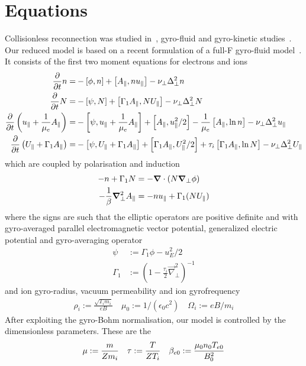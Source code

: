 \section{Equations}
Collisionless reconnection was studied in~\cite{Stanier2015}, gyro-fluid and gyro-kinetic studies~\cite{Comisso2013,Zacharias2014}.
Our reduced model is based on a recent formulation of a full-F gyro-fluid model~\cite{Madsen2013}.
It consists of the first two moment equations for electrons and ions
\begin{align}
\frac{\partial}{\partial t} \ne =&
 - \left[\phi, \ne\right]
+ \left[\Apar,\ne \ue  \right]
-\nu_\perp \Delta_\perp^2\ne
\\
\label{firstgyromom}
\frac{\partial}{\partial t} \Ni =&
 - \left[\psi, \Ni\right]
+ \left[\Gamma_1 \Apar ,\Ni \Ui  \right]
-\nu_\perp \Delta_\perp^2\Ni
 \\
\frac{\partial}{\partial t} \left( \ue+ \frac{1}{\mu_e} \Apar \right) =&
      -  \left[ \psi, \ue+ \frac{1}{\mu_e} \Apar  \right]%
    +   \left[\Apar,\ue^2/2   \right]%
      - \frac{1}{\mu_e}  \left[\Apar,\ln{\ne}   \right]
    -\nu_\perp \Delta_\perp^2\ue
      \\
      \frac{\partial}{\partial t} \left( \Ui+ \Gamma_1 \Apar  \right) =&
      -  \left[ \psi, \Ui+ \Gamma_1 \Apar  \right]%
     +   \left[\Gamma_1 \Apar,\Ui^2/2   \right]%
      + \tau_i  \left[\Gamma_1 \Apar,\ln{\Ni}   \right]
    -\nu_\perp \Delta_\perp^2\Ui
\end{align}
which are coupled by polarisation and induction
\begin{align}
 -n  + \Gamma_1 N &= -{\boldsymbol{\nabla}}\cdot\left(N {\boldsymbol{\nabla}}_\perp \phi\right) \\
 -\frac{1}{\beta} {\boldsymbol{\nabla}}_\perp^2 A_\parallel &=  -n  u_\parallel + \Gamma_1 (N U_\parallel)
\end{align}
where the signs are such that the elliptic operators are positive definite and
with gyro-averaged parallel electromagnetic vector potential, generalized electric potential and gyro-averaging operator
\begin{align}
 \psi &:= \Gamma_1 \phi - u_E^2 /2  \\
  \Gamma_1 &:= (1-\frac{\tau_i}{2} \vec{\nabla}_\perp^2 )^{-1}
\end{align}
and ion gyro-radius, vacuum permeability and ion gyrofrequency
\begin{align}
  \rho_{i}   := \frac{\sqrt{T_{i} m_i}}{e B} \quad
  \mu_0 := 1/(\epsilon_0 c^2) \quad
  \Omega_i := e B / m_i
\end{align}
After exploiting the gyro-Bohm normalisation, our model is controlled by the dimensionless parameters. These
are the
\begin{align}
 \mu   :=  \frac{m}{Z m_i} \quad
 \tau  :=  \frac{T}{ Z T_i}\quad
 \beta_{e0} :=  \frac{\mu_0 n_0 T_{e0} }{ B_0^2 }
\end{align}

